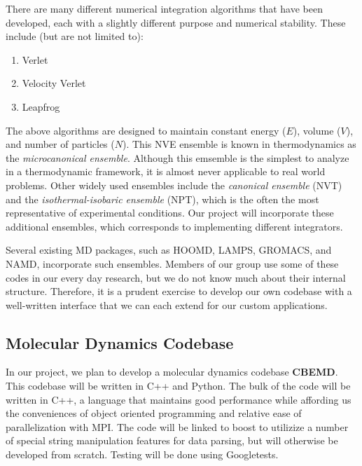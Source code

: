 \documentclass[10pt]{article}
\begin{document}

There are many different numerical integration algorithms that have been developed, each with a slightly different purpose and numerical stability.  These include (but are not limited to):

\begin{enumerate}
    \item Verlet
    \item Velocity Verlet
    \item Leapfrog
\end{enumerate}

The above algorithms are designed to maintain constant energy ($E$), volume ($V$), and number of particles ($N$).  This NVE ensemble is known in thermodynamics as the {\em microcanonical ensemble}.
Although this emsemble is the simplest to analyze in a thermodynamic framework, it is almost never applicable to real world problems.
Other widely used ensembles include the {\em canonical ensemble} (NVT) and the {\em isothermal-isobaric ensemble} (NPT), which is the often the most representative of experimental conditions.
Our project will incorporate these additional ensembles, which corresponds to implementing different integrators.

Several existing MD packages, such as HOOMD, LAMPS, GROMACS, and NAMD, incorporate such ensembles. Members of our group use some of these codes in our every day research, but we do not know much about their internal structure. Therefore, it is a prudent exercise to develop our own codebase with a well-written interface that we can each extend for our custom applications.

\subsection{Molecular Dynamics Codebase}
In our project, we plan to develop a molecular dynamics codebase \textbf{CBEMD}. This codebase will be written in C++ and Python. The bulk of the code will be written in C++, a language that maintains good performance while affording us the conveniences of object oriented programming and relative ease of parallelization with MPI.  The code will be linked to boost to utilizize a number of special string manipulation features for data parsing, but will otherwise be developed from scratch. Testing will be done using Googletests. 
\end{document}
